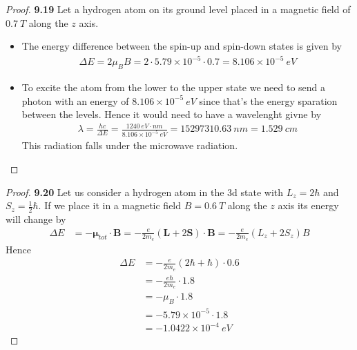 \documentclass[11pt]{article}
\newcommand{\sci}[1]{\times 10^{#1}}
\theoremstyle{definition}
\begin{document}
\cleardoublepage
\begin{proof}{\textbf{9.19}}
Let a hydrogen atom on its ground level placed in a magnetic field of $0.7~T$
along the $z$ axis.
\begin{itemize}
\item [\textbf{(a)}] The energy difference between the spin-up and spin-down
states is given by
\begin{align*}
    \Delta E = 2\mu_B B = 2\cdot 5.79\sci{-5} \cdot 0.7 = 8.106\sci{-5}~eV
\end{align*}
\item [\textbf{(b)}] To excite the atom from the lower to the upper state we
need to send a photon with an energy of $8.106\sci{-5}~eV$ since that's the
energy sparation between the levels. Hence it would need to have a wavelenght
givne by
\begin{align*}
    \lambda = \frac{hc}{\Delta E}
    = \frac{1240~eV\cdot nm}{8.106\sci{-5}~eV}
    = 15297310.63~nm = 1.529~cm
\end{align*}
This radiation falls under the microwave radiation.
\end{itemize}
\end{proof}

\cleardoublepage
\begin{proof}{\textbf{9.20}}
Let us consider a hydrogen atom in the 3d state with $L_z = 2\hbar$ and
$S_z = \frac{1}{2}\hbar$. If we place it in a magnetic field $B = 0.6~T$ along
the $z$ axis its energy will change by
\begin{align*}
    \Delta E &= -\bm{\mu}_{tot}\cdot \bm{B}
    = -\frac{e}{2m_e}(\bm{L} + 2\bm{S})\cdot \bm{B}
    = -\frac{e}{2m_e}(L_z + 2S_z) B
\end{align*}
Hence
\begin{align*}
    \Delta E
    &= -\frac{e}{2m_e}(2\hbar + \hbar) \cdot 0.6\\
    &= -\frac{e\hbar}{2m_e}\cdot 1.8\\
    &= -\mu_B\cdot 1.8\\
    &= -5.79\sci{-5} \cdot 1.8\\
    &= -1.0422\sci{-4}~eV
\end{align*}
\end{proof}
\end{document}
